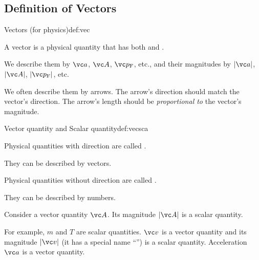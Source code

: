 \documentclass[11pt,pdfa,lastpage]{MishoNote}
\begin{document}
\subsection{Definition of Vectors}
\begin{definition}{Vectors (for physics)}{def:vec}
\begin{miniitemize}
  \item A vector is a physical quantity that has both  and .
  \item We describe them by $\vc a$, $\vc A$, $\vc p\w F$, etc.,
    and their magnitudes by $|\vc a|$, $|\vc A|$, $|\vc p\w F|$, etc.
  \item We often describe them by arrows. The arrow's direction should match the vector's direction. The arrow's length should be \emph{proportional to} the vector's magnitude.
\end{miniitemize}
\end{definition}
\OutputNote

\begin{definition}{Vector quantity and Scalar quantity}{def:vecsca}
  \begin{miniitemize}
    \item Physical quantities with direction are called .
    \begin{miniitemize} \item They can be described by vectors. \end{miniitemize}
    \item Physical quantities without direction are called .
    \begin{miniitemize} \item They can be described by numbers.\end{miniitemize}
    \item Consider a vector quantity $\vc A$. Its magnitude $|\vc A|$ is a scalar quantity.
  \end{miniitemize}
  \end{definition}
\OutputNote
For example,  $m$ and  $T$ are scalar quantities.  $\vc v$ is a vector quantity and its magnitude $|\vc v|$ (it has a special name ``'')  is a scalar quantity. Acceleration $\vc a$ is a vector quantity.
\end{document}
